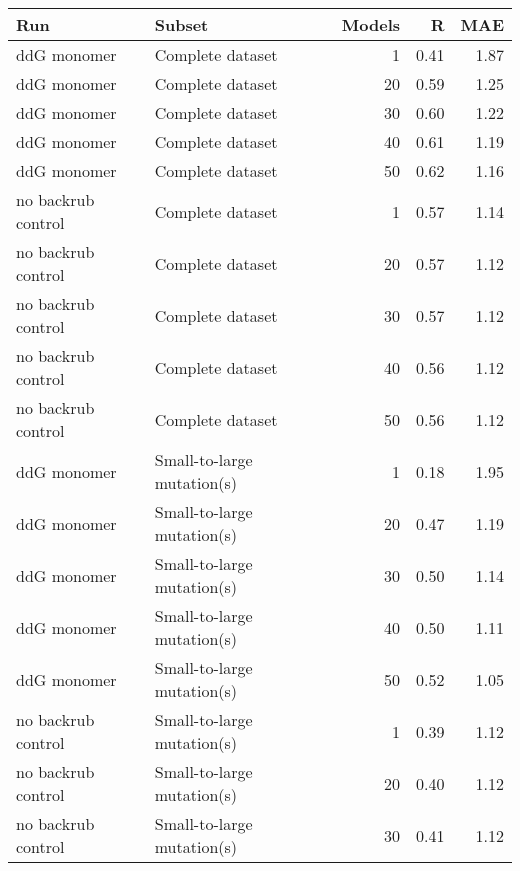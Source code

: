 \begin{table}
\begin{tabular}{llrrr}
\toprule
                Run &                               Subset &  Models &    R &  MAE \\
\midrule
        ddG monomer &                     Complete dataset &           1 & 0.41 & 1.87 \\
        ddG monomer &                     Complete dataset &          20 & 0.59 & 1.25 \\
        ddG monomer &                     Complete dataset &          30 & 0.60 & 1.22 \\
        ddG monomer &                     Complete dataset &          40 & 0.61 & 1.19 \\
        ddG monomer &                     Complete dataset &          50 & 0.62 & 1.16 \\
 no backrub control &                     Complete dataset &           1 & 0.57 & 1.14 \\
 no backrub control &                     Complete dataset &          20 & 0.57 & 1.12 \\
 no backrub control &                     Complete dataset &          30 & 0.57 & 1.12 \\
 no backrub control &                     Complete dataset &          40 & 0.56 & 1.12 \\
 no backrub control &                     Complete dataset &          50 & 0.56 & 1.12 \\
        ddG monomer &           Small-to-large mutation(s) &           1 & 0.18 & 1.95 \\
        ddG monomer &           Small-to-large mutation(s) &          20 & 0.47 & 1.19 \\
        ddG monomer &           Small-to-large mutation(s) &          30 & 0.50 & 1.14 \\
        ddG monomer &           Small-to-large mutation(s) &          40 & 0.50 & 1.11 \\
        ddG monomer &           Small-to-large mutation(s) &          50 & 0.52 & 1.05 \\
 no backrub control &           Small-to-large mutation(s) &           1 & 0.39 & 1.12 \\
 no backrub control &           Small-to-large mutation(s) &          20 & 0.40 & 1.12 \\
 no backrub control &           Small-to-large mutation(s) &          30 & 0.41 & 1.12 \\

\end{tabular}
\end{table}
